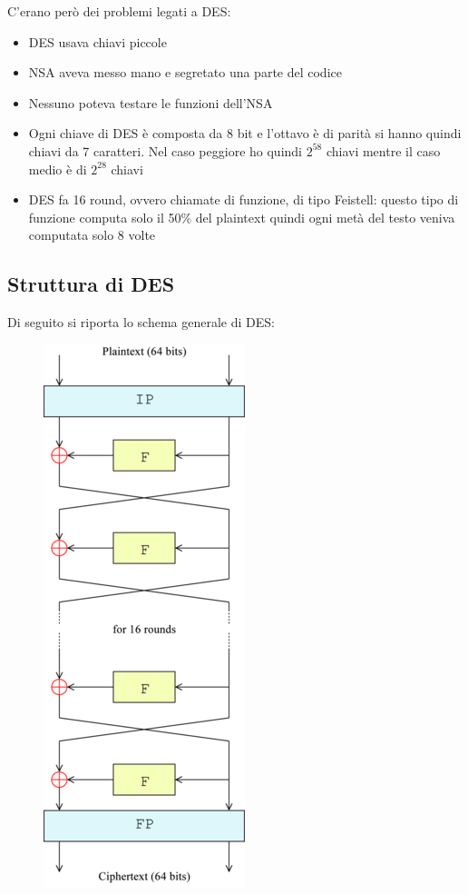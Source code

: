 \documentclass[10pt,a4paper]{article}
\begin{document}
C'erano però dei problemi legati a DES:
\begin{itemize}
\item DES usava chiavi piccole
\item NSA aveva messo mano e segretato una parte del codice
\item Nessuno poteva testare le funzioni dell'NSA
\item Ogni chiave di DES è composta da 8 bit e l'ottavo è di parità si hanno quindi chiavi da 7 caratteri. Nel caso peggiore ho quindi $2^58$ chiavi mentre il caso medio è di $2^28$ chiavi
\item DES fa 16 round, ovvero chiamate di funzione, di tipo Feistell: questo tipo di funzione computa solo il 50\% del plaintext quindi ogni metà del testo veniva computata solo 8 volte
\end{itemize}
\subsection{Struttura di DES}
Di seguito si riporta lo schema generale di DES:

\begin{figure}[htbp]
\includegraphics[scale=0.6]{immagini/DES_fastell.png}
\end{figure}
\end{document}
